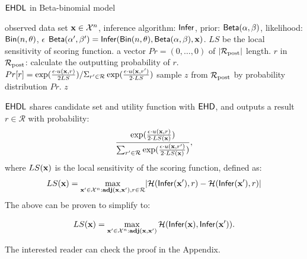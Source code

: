 \documentclass{article}
\begin{document}
  \begin{algorithm}
  \caption{$\mathsf{EHDL}$ in Beta-binomial model}
  \label{mech:expmech}
  \begin{algorithmic}
  \INPUT observed data set $\textbf{x} \in \mathcal{X}^n$, inference algorithm: $\mathsf{Infer}$, 
  prior: $\mathsf{Beta}(\alpha, \beta)$, likelihood: $\mathsf{Bin}(n, \theta)$, $\epsilon$
  \STATE {} $\mathsf{Beta}(\alpha', \beta') = \mathsf{Infer}(\mathsf{Bin}(n, \theta), \mathsf{Beta}(\alpha, \beta), \textbf{x})$. $LS$ be the local sensitivity of scoring function.  
  \STATE {} a vector $Pr = (0, \dots, 0 )$ of $|\mathcal{R}_{\textup{post}}|$ length.
  \STATE {} $r$ in $\mathcal{R}_{\textup{post}}$:
  \STATE \quad \quad calculate the outputting probability of $r$.
  \STATE \quad \quad $Pr[r] = 
  {\exp(\frac{\epsilon\cdot u(\textbf{x}, {r})}{2 LS})}
/ {\Sigma_{r' \in \mathcal{R}}\exp(\frac{\epsilon\cdot u(\textbf{x}, {r'})}{2\cdot LS})}$
\STATE \quad sample $z$ from $\mathcal{R}_{\textup{post}}$ by probability distribution $Pr$.
   $z$
  \end{algorithmic}
  \end{algorithm}


$\mathsf{EHDL}$ shares candidate set and utility function with $\mathsf{EHD}$,
and outputs a result $r \in \mathcal{R}$ with probability:
\[
\frac
  {\exp(\frac{\epsilon \cdot u(\textbf{x}, {r})}{2\cdot LS(\textbf{x})})}
{\sum_{r' \in \mathcal{R}}\exp(\frac{\epsilon\cdot u(\textbf{x}, {r'})}{2\cdot LS(\textbf{x})})},
\]
where $LS(\textbf{x})$ is the local sensitivity of the scoring function, defined as:
\begin{equation}\label{eq:local_sensitivity_scoring}
LS(\textbf{x})=\max_{\textbf{x}' \in \mathcal{X}^n: \\ \textbf{adj}(\textbf{x},\textbf{x}'), r\in \mathcal{R}}\lvert \mathcal{H}(\mathsf{Infer}(\textbf{x}'), r) - \mathcal{H}(\mathsf{Infer}(\textbf{x}'), r)\rvert 
\end{equation}
The above can be proven to simplify to:
\begin{lem}
\label{lem_loc_opt}
\[
LS(\textbf{x}) = \max\limits_{\textbf{x}' \in \mathcal{X}^n:\textbf{adj}(\textbf{x},\textbf{x}')} \mathcal{H}(\mathsf{Infer}(\textbf{x}), \mathsf{Infer}(\textbf{x}')).
\]
\end{lem}
The interested reader can check the proof in the Appendix.
\end{document}
